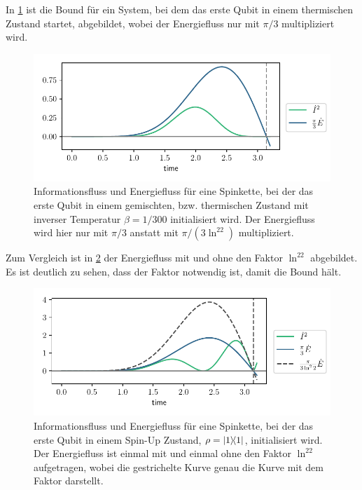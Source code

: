 \documentclass[a4paper,11pt]{scrartcl}
\begin{document}
In \cref{fig:pendry-perf-initialstate-thermal} ist die Bound für ein System,
bei dem das erste Qubit in einem thermischen Zustand startet, abgebildet, wobei
der Energiefluss nur mit $\pi/3$ multipliziert wird.
\begin{figure}[H]
    \centering
    \includegraphics{pendry_propagate_thermal_state_energy_without_ln2_new.pdf}
    \caption{Informationsfluss und Energiefluss für eine Spinkette, bei der
    das erste Qubit in einem gemischten, bzw. thermischen Zustand mit
    inverser Temperatur $\beta = 1/300$ initialisiert wird.
    Der Energiefluss wird hier nur mit $\pi/3$ anstatt mit $\pi/(3\ln^22)$
    multipliziert.}
    \label{fig:pendry-perf-initialstate-thermal}
\end{figure}
Zum Vergleich ist in \cref{fig:pendry-perf-init-spinup-with-and-without-ln2}
der Energiefluss mit und ohne den Faktor $\ln^22$ abgebildet. Es ist deutlich
zu sehen, dass der Faktor notwendig ist, damit die Bound hält.
\begin{figure}[H]
	\centering
	\includegraphics{pendry_propagate_spinup_state_energy_with_and_without_ln2_with=dashed.pdf}
	\caption{Informationsfluss und Energiefluss für eine Spinkette, bei der
	das erste Qubit in einem Spin-Up Zustand, $\rho=\dyad{1}$, initialisiert
	wird. Der Energiefluss ist einmal mit und einmal ohne den Faktor $\ln^22$
	aufgetragen, wobei die gestrichelte Kurve genau die Kurve mit dem Faktor
	darstellt.}
	\label{fig:pendry-perf-init-spinup-with-and-without-ln2}
\end{figure}
\end{document}
